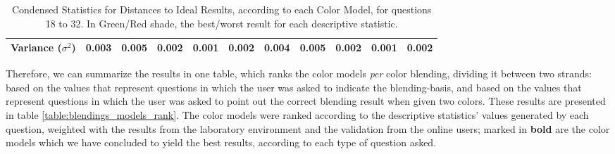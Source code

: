 \begin{itemize}
\begin{table}[htbp]
{\begin{tabular}{@{}ccccccccccc@{}}
      \multicolumn{1}{c|}{Variance ($\sigma^2$)}                                                      & \cellcolor[HTML]{FFFFFF}0.003         & \cellcolor[HTML]{CB0000}\textbf{0.005} & \cellcolor[HTML]{FFFFFF}0.002         & \cellcolor[HTML]{32CB00}\textbf{0.001} & \multicolumn{1}{c|}{\cellcolor[HTML]{FFFFFF}0.002}         & \cellcolor[HTML]{FFFFFF}0.004         & \cellcolor[HTML]{CB0000}\textbf{0.005} & \cellcolor[HTML]{FFFFFF}0.002         & \cellcolor[HTML]{32CB00}\textbf{0.001} & \multicolumn{1}{c|}{\cellcolor[HTML]{FFFFFF}0.002} \\ \bottomrule
    \end{tabular}}
    \caption[Condensed Statistics for Distances to Ideal Results, according to each Color Model, for questions 18 to 32.]{Condensed Statistics for Distances to Ideal Results, according to each Color Model, for questions 18 to 32. In Green/Red shade, the best/worst result for each descriptive statistic.}
    \label{table:colormodels_expectations_labonline_statistics}
  \end{table}
\end{itemize}
%
Therefore, we can summarize the results in one table, which ranks the color models \emph{per} color blending, dividing it between two strands: based on the values that represent questions in which the user was
asked to indicate the blending-basis, and based on the values that represent questions in which the user was asked to point out the correct blending result when given two colors. These results are presented in
table \ref{table:blendings_models_rank}. The color models were ranked according to the descriptive statistics' values generated by each question, weighted with the results from the laboratory environment and the
validation from the online users; marked in \textbf{bold} are the color models which we have concluded to yield the best results, according to each type of question asked.
%
